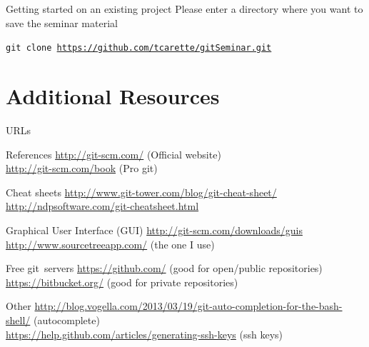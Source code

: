 \documentclass{beamer}
\begin{document}
\begin{frame}{Getting started on an existing project}
Please enter a directory where you want to save the seminar material\pause
\begin{block}{}
\texttt{\footnotesize git~clone \url{https://github.com/tcarette/gitSeminar.git}}
\end{block}
\end{frame}
\section{Additional Resources}
\begin{frame}{URLs}
\tiny

\begin{block}{References}
\url{http://git-scm.com/} (Official website)\\
\url{http://git-scm.com/book} (Pro git)
\end{block}

\begin{block}{Cheat sheets}
\url{http://www.git-tower.com/blog/git-cheat-sheet/}\\
\url{http://ndpsoftware.com/git-cheatsheet.html}
\end{block}

\begin{block}{Graphical User Interface (GUI)}
\url{http://git-scm.com/downloads/guis}\\
\url{http://www.sourcetreeapp.com/} (the one I use)
\end{block}

\begin{block}{Free git~servers}
\url{https://github.com/} (good for open/public repositories)\\
\url{https://bitbucket.org/} (good for private repositories)
\end{block}

\begin{block}{Other}
\url{http://blog.vogella.com/2013/03/19/git-auto-completion-for-the-bash-shell/} (autocomplete)\\
\url{https://help.github.com/articles/generating-ssh-keys} (ssh keys)
\end{block}

\end{frame}
\end{document}

